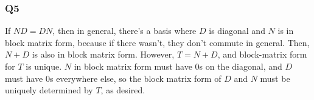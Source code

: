 \documentclass{article}
\begin{document}
\subsubsection{Q5}
If $ND = DN$, then in general, there's a basis where $D$ is diagonal and $N$ is in block matrix form, because if there wasn't, they don't commute in general. Then, $N+D$ is also in block matrix form. However, $T = N + D$, and block-matrix form for $T$ is unique. $N$ in block matrix form must have 0s on the diagonal, and $D$ must have 0s everywhere else, so the block matrix form of $D$ and $N$ must be uniquely determined by $T$, as desired. 
\end{document}
